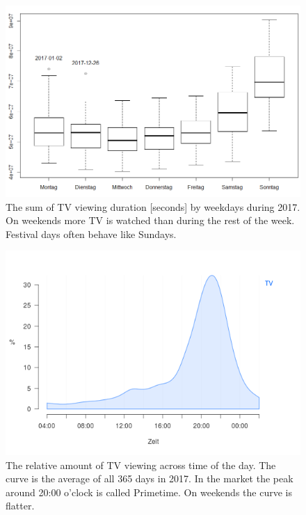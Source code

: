 \documentclass[]{article}
\begin{document}
\begin{figure}[H]

{\centering \includegraphics[width=0.9\linewidth]{../data/tv-week} 

}

\caption{\label{fig:fig1}The sum of TV viewing duration [seconds] by weekdays during 2017. On weekends more TV is watched than during the rest of the week. Festival days often behave like Sundays.}\label{fig:unnamed-chunk-2}
\end{figure}

\begin{figure}[H]

{\centering \includegraphics[width=0.9\linewidth]{../data/tv-day} 

}

\caption{\label{fig:fig2} The relative amount of TV viewing across time of the day. The curve is the average of all 365 days in 2017. In the market the peak around 20:00 o'clock is called Primetime. On weekends the curve is flatter.}\label{fig:unnamed-chunk-3}
\end{figure}
\end{document}

